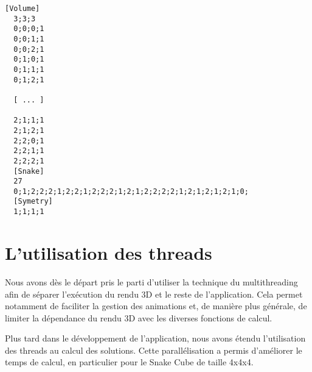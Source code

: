 \newpage
\begin{lstlisting}[caption=Contenu du fichier snake.snake]
 [Volume]
  3;3;3
  0;0;0;1
  0;0;1;1
  0;0;2;1
  0;1;0;1
  0;1;1;1
  0;1;2;1
 
  [ ... ]
 
  2;1;1;1
  2;1;2;1
  2;2;0;1
  2;2;1;1
  2;2;2;1
  [Snake]
  27
  0;1;2;2;2;1;2;2;1;2;2;2;1;2;1;2;2;2;2;1;2;1;2;1;2;1;0;
  [Symetry]
  1;1;1;1
\end{lstlisting}\label{.snake}

\section{L'utilisation des threads}
Nous avons dès le départ pris le parti d'utiliser la technique du multithreading afin de séparer l’exécution du rendu 3D et le reste de l'application. Cela permet notamment de faciliter la gestion des animations et, de manière plus générale, de limiter la dépendance du rendu 3D avec les diverses fonctions de calcul. 

Plus tard dans le développement de l'application, nous avons étendu l'utilisation des threads au calcul des solutions. Cette parallélisation a permis d'améliorer le temps de calcul, en particulier pour le Snake Cube de taille 4x4x4.